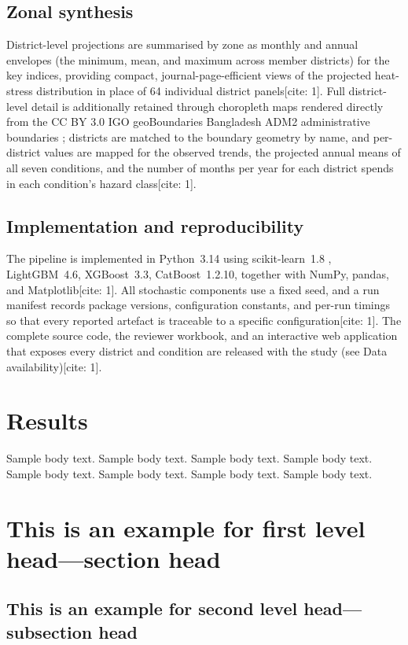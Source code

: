 \documentclass[pdflatex,sn-mathphys-ay]{sn-jnl}
\begin{document}
\subsection{Zonal synthesis}\label{sec:zonal}
District-level projections are summarised by zone as monthly and annual envelopes (the minimum, mean, and maximum across member districts) for the key indices, providing compact, journal-page-efficient views of the projected heat-stress distribution in place of 64 individual district panels[cite: 1]. Full district-level detail is additionally retained through choropleth maps rendered directly from the CC BY 3.0 IGO geoBoundaries Bangladesh ADM2 administrative boundaries \citep{GeoBoundaries2020}; districts are matched to the boundary geometry by name, and per-district values are mapped for the observed trends, the projected annual means of all seven conditions, and the number of months per year for each district spends in each condition's hazard class[cite: 1].

\subsection{Implementation and reproducibility}\label{sec:impl}
The pipeline is implemented in Python~3.14 using scikit-learn~1.8 \citep{Pedregosa2011}, LightGBM~4.6, XGBoost~3.3, CatBoost~1.2.10, together with NumPy, pandas, and Matplotlib[cite: 1]. All stochastic components use a fixed seed, and a run manifest records package versions, configuration constants, and per-run timings so that every reported artefact is traceable to a specific configuration[cite: 1]. The complete source code, the reviewer workbook, and an interactive web application that exposes every district and condition are released with the study (see Data availability)[cite: 1].

\section{Results}\label{sec2}

Sample body text. Sample body text. Sample body text. Sample body text. Sample body text. Sample body text. Sample body text. Sample body text.

\section{This is an example for first level head---section head}\label{sec3}

\subsection{This is an example for second level head---subsection head}\label{subsec2}
\end{document}
